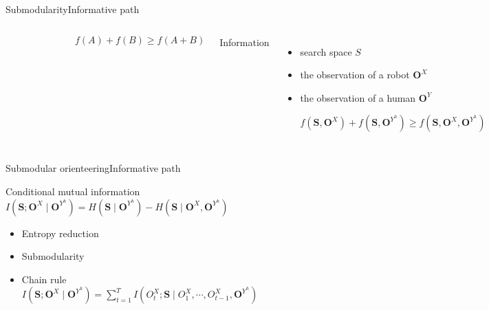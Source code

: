 \begin{frame}{Submodularity}{Informative path}

\begin{columns}


\begin{figure}
\centering
\includegraphics[width = \textwidth]{./figure/submodular}
\end{figure}

\begin{equation}
\nonumber
f(A) + f(B) \geq f(A+B)
\end{equation}



Information
\begin{itemize}
\item search space $ S $
\item the observation of a robot $ \mathbf{O}^{X} $ 
\item the observation of a human $ \mathbf{O}^{Y} $

\bigskip
\bigskip

$ f( \mathbf{S}, \mathbf{O}^{X} ) + f( \mathbf{S}, \mathbf{O}^{Y^{h}} ) \geq f( \mathbf{S}, \mathbf{O}^{X},  \mathbf{O}^{Y^{h}} ) $ 
\end{itemize}

\end{columns}

\end{frame}

\begin{frame}{Submodular orienteering}{Informative path}

\begin{block}{Conditional mutual information}
$ I(\mathbf{S}; \mathbf{O}^{X} \mid \mathbf{O}^{Y^{h}}) = H(\mathbf{S} \mid \mathbf{O}^{Y^{h}}) - H(\mathbf{S} \mid \mathbf{O}^{X},\mathbf{O}^{Y^{h}}) $
\end{block} 

\bigskip

\begin{itemize}
\item Entropy reduction
\item Submodularity
\item Chain rule \\
$ I(\mathbf{S}; \mathbf{O}^{X} \mid \mathbf{O}^{Y^{h}}) = \sum_{t=1}^{T} I(O^{X}_{t} ; \mathbf{S} \mid O^{X}_{1} , \cdots , O^{X}_{t-1}, \mathbf{O}^{Y^{h}}) $
\end{itemize}

\end{frame}

